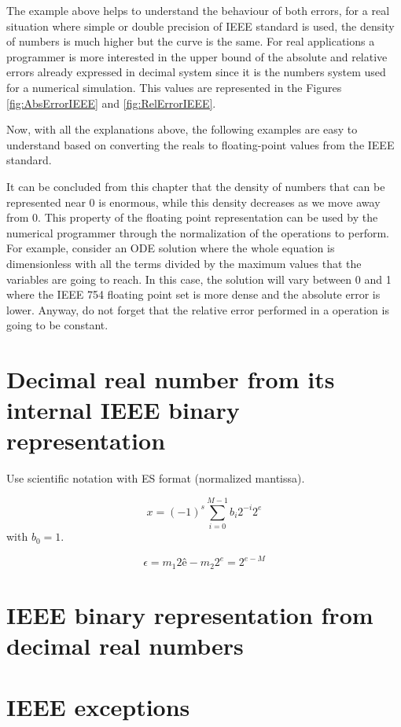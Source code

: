 The example above helps to understand the behaviour of both errors, for a real situation where simple or double precision of IEEE standard is 
used, the density of numbers is much higher but the curve is the same. For real applications a programmer is more interested in the upper 
bound of the absolute and relative errors already expressed in decimal system since it is the numbers system used for a numerical simulation. 
This values are represented in the Figures \ref{fig:AbsErrorIEEE} and \ref{fig:RelErrorIEEE}.

Now, with all the explanations above, the following examples are easy to understand based on converting the reals to floating-point values 
from the IEEE standard. 

It can be concluded from this chapter that the density of numbers that can be represented near 0 is enormous, while this density decreases as 
we move away from 0. This property of the floating point representation can be used by the numerical programmer through the normalization of 
the operations to perform. For example, consider an ODE solution where the whole equation is dimensionless with all the terms divided by the 
maximum values that the variables are going to reach. In this case, the solution will vary between 0 and 1 where the IEEE 754 floating point 
set is more dense and the absolute error is lower. Anyway, do not forget that the relative error performed in a operation is going to be 
constant. 




\section{Decimal real number from its internal IEEE binary representation}
Use scientific notation with ES format (normalized mantissa).

$$
   x = (-1) ^s \sum_{i=0}^{M-1}  b_i 2^{-i} 2^e 
$$
with $b_0 = 1$. 

$$
   \epsilon = m_1 2 ê - m_2 2^e  = 2^{e-M} 
$$


\section{IEEE binary representation from decimal real numbers}


\section{IEEE exceptions}

